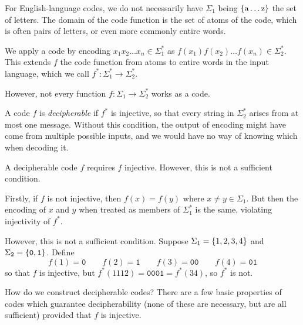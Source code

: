 \documentclass{article}
\begin{document}
\begin{note}
	 For English-language codes,
	 we do not necessarily have $\Sigma_1$ being
	 $\left\lbrace \mathrm{a} \dots \mathrm{z} \right\rbrace$
	 the set of letters.
	 The domain of the code function is the set of atoms of the code,
	 which is often pairs of letters, or even more commonly entire words.
\end{note}

We apply a code by encoding
$x_1x_2\dots x_n \in \Sigma_1^*$ as
$f(x_1)f(x_2)\dots f(x_n) \in \Sigma_2^*$.
This extends $f$ the code function
from atoms to entire words in the input language,
which we call $f^*: \Sigma_1^* \to \Sigma_2^*$.

However, not every function $f: \Sigma_1 \to \Sigma_2^*$ works as a code.

\begin{definition}[Decipherable]
	\label{decipherable-definition}
    A code $f$ is \textit{decipherable} if $f^*$ is injective,
    so that every string in $\Sigma_2^*$ arises from at most one message.
    Without this condition, the output of encoding
    might have come from multiple possible inputs,
    and we would have no way of knowing which when decoding it.
\end{definition}

\begin{proposition}
	\label{decipherability-requires-injectivity}
	A decipherable code $f$ requires $f$ injective.
	However, this is not a sufficient condition.
\end{proposition}

\begin{prf}
    Firstly, if $f$ is not injective,
    then $f(x) = f(y)$ where $x \neq y \in \Sigma_1$.
    But then the encoding of $x$ and $y$
    when treated as members of $\Sigma_1^*$ is the same,
    violating injectivity of $f^*$.
    
    However, this is not a sufficient condition.
    Suppose $\Sigma_1 = \left\lbrace 1, 2, 3, 4 \right\rbrace$ and $\Sigma_2 = \left\lbrace \texttt{0}, \texttt{1} \right\rbrace$.
    Define
    \[
	f(1) = \texttt{0}
	\qquad
	f(2) = \texttt{1}
	\qquad
	f(3) = \texttt{00}
	\qquad
	f(4) = \texttt{01}
	\]
	so that $f$ is injective,
	but $f^*(1112) = \texttt{0001} = f^*(34)$,
	so $f^*$ is not.
\end{prf}

How do we construct decipherable codes?
There are a few basic properties of codes which guarantee decipherability
(none of these are necessary, but are all sufficient)
provided that $f$ is injective.
\end{document}
